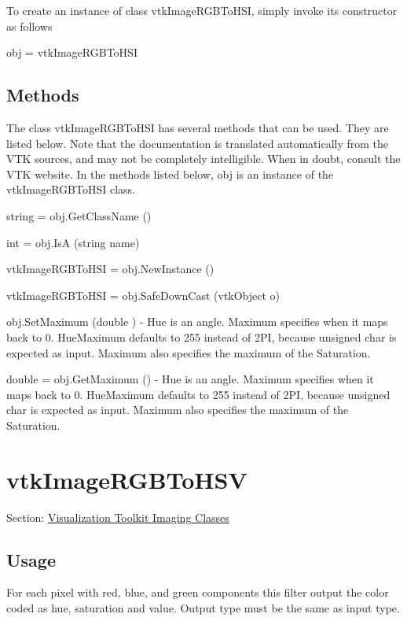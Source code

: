 To create an instance of class vtk\-Image\-R\-G\-B\-To\-H\-S\-I, simply invoke its constructor as follows \begin{DoxyVerb}  obj = vtkImageRGBToHSI
\end{DoxyVerb}
 \hypertarget{vtkwidgets_vtkxyplotwidget_Methods}{}\subsection{Methods}\label{vtkwidgets_vtkxyplotwidget_Methods}
The class vtk\-Image\-R\-G\-B\-To\-H\-S\-I has several methods that can be used. They are listed below. Note that the documentation is translated automatically from the V\-T\-K sources, and may not be completely intelligible. When in doubt, consult the V\-T\-K website. In the methods listed below, {\ttfamily obj} is an instance of the vtk\-Image\-R\-G\-B\-To\-H\-S\-I class. 
\begin{DoxyItemize}
\item {\ttfamily string = obj.\-Get\-Class\-Name ()}  
\item {\ttfamily int = obj.\-Is\-A (string name)}  
\item {\ttfamily vtk\-Image\-R\-G\-B\-To\-H\-S\-I = obj.\-New\-Instance ()}  
\item {\ttfamily vtk\-Image\-R\-G\-B\-To\-H\-S\-I = obj.\-Safe\-Down\-Cast (vtk\-Object o)}  
\item {\ttfamily obj.\-Set\-Maximum (double )} -\/ Hue is an angle. Maximum specifies when it maps back to 0. Hue\-Maximum defaults to 255 instead of 2\-P\-I, because unsigned char is expected as input. Maximum also specifies the maximum of the Saturation.  
\item {\ttfamily double = obj.\-Get\-Maximum ()} -\/ Hue is an angle. Maximum specifies when it maps back to 0. Hue\-Maximum defaults to 255 instead of 2\-P\-I, because unsigned char is expected as input. Maximum also specifies the maximum of the Saturation.  
\end{DoxyItemize}\hypertarget{vtkimaging_vtkimagergbtohsv}{}\section{vtk\-Image\-R\-G\-B\-To\-H\-S\-V}\label{vtkimaging_vtkimagergbtohsv}
Section\-: \hyperlink{sec_vtkimaging}{Visualization Toolkit Imaging Classes} \hypertarget{vtkwidgets_vtkxyplotwidget_Usage}{}\subsection{Usage}\label{vtkwidgets_vtkxyplotwidget_Usage}
For each pixel with red, blue, and green components this filter output the color coded as hue, saturation and value. Output type must be the same as input type.

